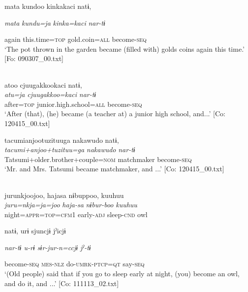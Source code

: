 \begin{table}
      mata  kundoo  kinkakaci  natɨ,

      \textit{mata}  \textit{kundu=ja}  \textit{kinka=kaci}  \textit{nar-tɨ}

      again  this.time=\textsc{top}  gold.coin=\textsc{all}  become-\textsc{seq}\\
\glt ‘The pot thrown in the garden became (filled with) golds coins again this time.’ [Fo: 090307\_00.txt]
\z

\ex{}\\
{\TM}
\glll  atoo  cjuugakkookaci  natɨ,\\
\textit{atu=ja}  \textit{cjuugakkoo=kaci}  \textit{nar-tɨ}\\
after=\textsc{top}  junior.high.school=\textsc{all}  become-\textsc{seq}\\
\glt ‘After (that), (he) became (a teacher at) a junior high school, and...’ [Co: 120415\_00.txt]
\z

\ex {\TM}  tacumianjootuzituuga  nakawudo  natɨ,\\
\glll \textit{tacumi+anjoo+tuzituu=ga}  \textit{nakawudo}  \textit{nar-tɨ}\\
Tatsumi+older.brother+couple=\textsc{nom}  matchmaker  become-\textsc{seq}\\
\glt ‘Mr. and Mrs. Tatsumi became matchmaker, and ...’ [Co: 120415\_00.txt]
\z

\ex{}\\
{\TM}
\glll  jurunkjoojoo,  hajasa  nɨbuppoo,  kuuhuu\\
\textit{juru=nkja=ja=joo}  \textit{haja-sa}  \textit{nɨbur-boo}  \textit{kuuhuu}\\
night=\textsc{appr}=\textsc{top}=\textsc{cfm}1  early-\textsc{adj}  sleep-\textsc{cnd}  owl

      natɨ,  urɨ  sjuncjɨ  jˀicjɨ

      \textit{nar-tɨ  u-rɨ  sɨr-jur-n=ccjɨ  jˀ-tɨ}

      become-\textsc{seq}  \textsc{mes}-\textsc{nlz}  do-\textsc{umrk}-\textsc{ptcp}=\textsc{qt}  say-\textsc{seq}\\
\glt ‘(Old people) said that if you go to sleep early at night, (you) become an owl, and do it, and ...’ [Co: 111113\_02.txt]
\z


\end{table}
